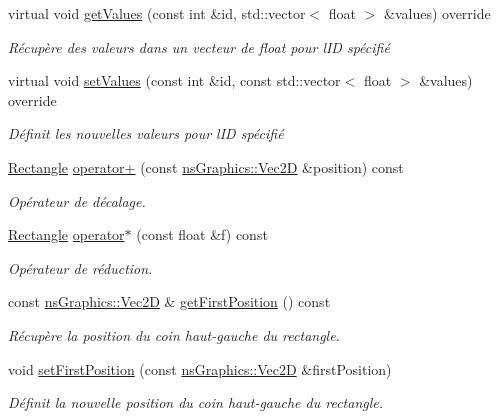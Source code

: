 \begin{DoxyCompactItemize}
virtual void \hyperlink{classns_shape_1_1_rectangle_a379d73a44d0601a12f26d4867e4246d8}{get\+Values} (const int \&id, std\+::vector$<$ float $>$ \&values) override
\begin{DoxyCompactList}\small\item\em Récupère des valeurs dans un vecteur de float pour l\textquotesingle{}ID spécifié \end{DoxyCompactList}\item 
virtual void \hyperlink{classns_shape_1_1_rectangle_a9fcdc9a8adbc91cd2613a0d50058f829}{set\+Values} (const int \&id, const std\+::vector$<$ float $>$ \&values) override
\begin{DoxyCompactList}\small\item\em Définit les nouvelles valeurs pour l\textquotesingle{}ID spécifié \end{DoxyCompactList}\item 
\hyperlink{classns_shape_1_1_rectangle}{Rectangle} \hyperlink{classns_shape_1_1_rectangle_ac86de3402279c3ad0bf6b3869f8e2613}{operator+} (const \hyperlink{classns_graphics_1_1_vec2_d}{ns\+Graphics\+::\+Vec2D} \&position) const
\begin{DoxyCompactList}\small\item\em Opérateur de décalage. \end{DoxyCompactList}\item 
\hyperlink{classns_shape_1_1_rectangle}{Rectangle} \hyperlink{classns_shape_1_1_rectangle_af7cbf6d75b4bc8fc718d17177abdd344}{operator$\ast$} (const float \&f) const
\begin{DoxyCompactList}\small\item\em Opérateur de réduction. \end{DoxyCompactList}\item 
const \hyperlink{classns_graphics_1_1_vec2_d}{ns\+Graphics\+::\+Vec2D} \& \hyperlink{classns_shape_1_1_rectangle_a42c38f27b247f6a411a9d1a8de5ceaa4}{get\+First\+Position} () const
\begin{DoxyCompactList}\small\item\em Récupère la position du coin haut-\/gauche du rectangle. \end{DoxyCompactList}\item 
void \hyperlink{classns_shape_1_1_rectangle_ae6c787fad1bc33f5a4adf8a697a9a581}{set\+First\+Position} (const \hyperlink{classns_graphics_1_1_vec2_d}{ns\+Graphics\+::\+Vec2D} \&first\+Position)
\begin{DoxyCompactList}\small\item\em Définit la nouvelle position du coin haut-\/gauche du rectangle. \end{DoxyCompactList}\item 

\end{DoxyCompactItemize}
